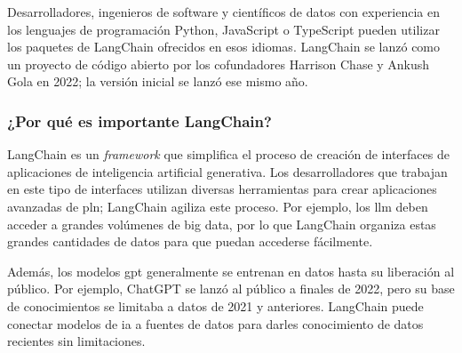 Desarrolladores, ingenieros de software y científicos de datos con experiencia en los lenguajes de programación Python, JavaScript o TypeScript pueden utilizar los paquetes de LangChain ofrecidos en esos idiomas. LangChain se lanzó como un proyecto de código abierto por los cofundadores Harrison Chase y Ankush Gola en 2022; la versión inicial se lanzó ese mismo año\cite{Langchain}.

\subsubsection{¿Por qué es importante LangChain?}
LangChain es un \textit{framework} que simplifica el proceso de creación de interfaces de aplicaciones de inteligencia artificial generativa. Los desarrolladores que trabajan en este tipo de interfaces utilizan diversas herramientas para crear aplicaciones avanzadas de \acrshort{pln}; LangChain agiliza este proceso. Por ejemplo, los \acrshort{llm} deben acceder a grandes volúmenes de big data, por lo que LangChain organiza estas grandes cantidades de datos para que puedan accederse fácilmente.

Además, los modelos \acrfull{gpt} generalmente se entrenan en datos hasta su liberación al público. Por ejemplo, ChatGPT se lanzó al público a finales de 2022, pero su base de conocimientos se limitaba a datos de 2021 y anteriores. LangChain puede conectar modelos de \acrshort{ia} a fuentes de datos para darles conocimiento de datos recientes sin limitaciones.


